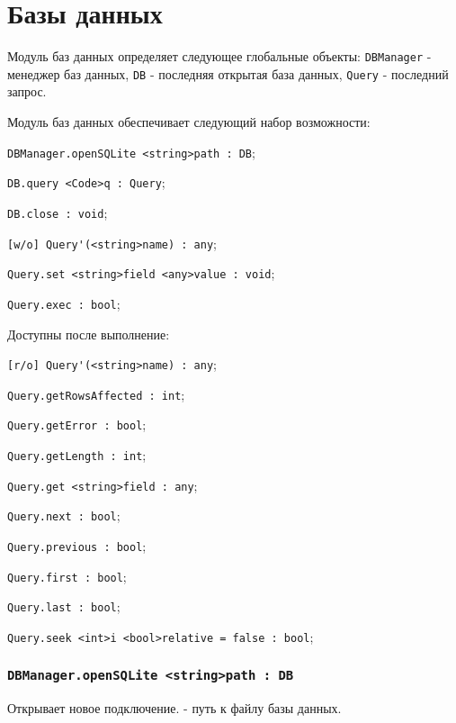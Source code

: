 \section{Базы данных}

Модуль баз данных определяет следующее глобальные объекты: \lstinline|DBManager| - менеджер баз данных, \lstinline|DB| - последняя открытая база данных, \lstinline|Query| - последний запрос.

Модуль баз данных обеспечивает следующий набор возможности:
\begin{icItems}
	\item \lstinline|DBManager.openSQLite <string>path : DB|;
	\item \lstinline|DB.query <Code>q : Query|;
	\item \lstinline|DB.close : void|;
	\item \lstinline|[w/o] Query'(<string>name) : any|;
	\item \lstinline|Query.set <string>field <any>value : void|;
	\item \lstinline|Query.exec : bool|;
	\item Доступны после выполнение:
	\begin{icItems}
		\item \lstinline|[r/o] Query'(<string>name) : any|;
		\item \lstinline|Query.getRowsAffected : int|;
		\item \lstinline|Query.getError : bool|;
		\item \lstinline|Query.getLength : int|;
		\item \lstinline|Query.get <string>field : any|;
		\item \lstinline|Query.next : bool|;
		\item \lstinline|Query.previous : bool|;
		\item \lstinline|Query.first : bool|;
		\item \lstinline|Query.last : bool|;
		\item \lstinline|Query.seek <int>i <bool>relative = false : bool|;
	\end{icItems}
\end{icItems}

\subsubsection{\lstinline|DBManager.openSQLite <string>path : DB|}

Открывает новое подключение.  - путь к файлу базы данных.

